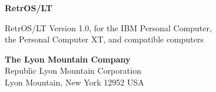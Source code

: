 \frontpages
\setcounter{page}{1}
\pagestyle{blank}
\vspace*{0.4in}
\hspace*{-\dimexpr\marginparwidth+\marginparsep\relax}%
\begin{minipage}[t]{\dimexpr\textwidth+\marginparwidth+\marginparsep\relax}
\raggedright
{\cond\bfseries\fontsize{40}{44}\selectfont\color{disc} RetrOS/LT\par}
\vspace{6pt}
{\cond\fontsize{17}{21}\selectfont\color{disc} \subtitleline\par}
\vspace{14pt}
\par
\vspace{14pt}
{\sffamily\bfseries\fontsize{22}{26}\selectfont \booktitle\par}
\vspace{8pt}
{\large RetrOS/LT Version 1.0, for the IBM Personal Computer,\\
the Personal Computer XT, and compatible computers\par}
\vspace{0.5in}
\hspace*{0.3in}\par
\vspace{24pt}
{\small\textbf{The Lyon Mountain Company}\\
Republic Lyon Mountain Corporation\\
Lyon Mountain, New York 12952 USA\par}
\end{minipage}
\newpage

